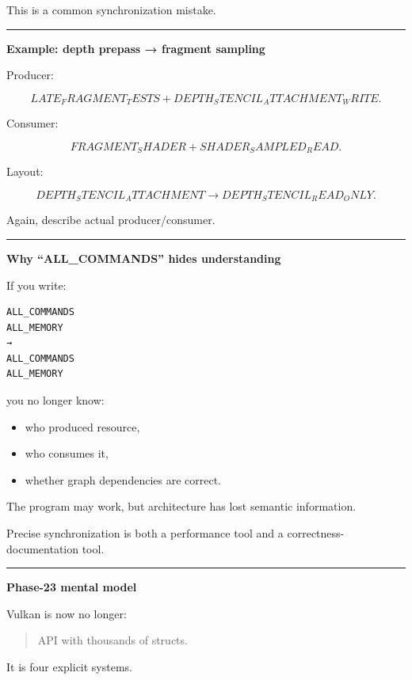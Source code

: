 This is a common synchronization mistake.

\begin{center}\rule{0.5\linewidth}{0.5pt}\end{center}

\textbf{Example: depth prepass → fragment sampling}

Producer:

\[
LATE_FRAGMENT_TESTS
+
DEPTH_STENCIL_ATTACHMENT_WRITE.
\]

Consumer:

\[
FRAGMENT_SHADER
+
SHADER_SAMPLED_READ.
\]

Layout:

\[
DEPTH_STENCIL_ATTACHMENT
\rightarrow
DEPTH_STENCIL_READ_ONLY.
\]

Again, describe actual producer/consumer.

\begin{center}\rule{0.5\linewidth}{0.5pt}\end{center}

\textbf{Why ``ALL\_COMMANDS'' hides understanding}

If you write:

\begin{verbatim}
ALL_COMMANDS
ALL_MEMORY
→
ALL_COMMANDS
ALL_MEMORY
\end{verbatim}

you no longer know:

\begin{itemize}
\tightlist
\item
  who produced resource,
\item
  who consumes it,
\item
  whether graph dependencies are correct.
\end{itemize}

The program may work, but architecture has lost semantic information.

Precise synchronization is both a performance tool and a correctness-documentation tool.

\begin{center}\rule{0.5\linewidth}{0.5pt}\end{center}

\textbf{Phase-23 mental model}

Vulkan is now no longer:

\begin{quote}
API with thousands of structs.
\end{quote}

It is four explicit systems.

